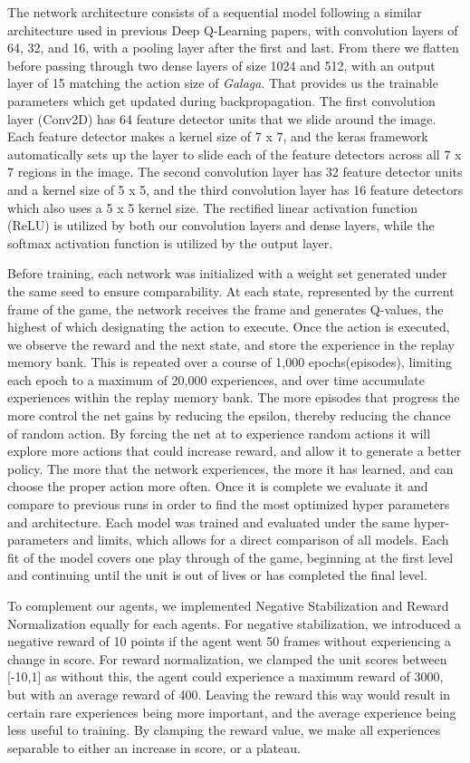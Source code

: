 \documentclass[conference]{IEEEtran}
\begin{document}
The network architecture consists of a sequential model following a similar architecture used in previous Deep Q-Learning papers, with convolution layers of 64, 32, and 16, with a pooling layer after the first and last. From there we flatten before passing through two dense layers of size 1024 and 512, with an output layer of 15 matching the action size of \textit{Galaga}. That provides us the trainable parameters which get updated during backpropagation. The first convolution layer (Conv2D) has 64 feature detector units that we slide around the image. Each feature detector makes a kernel size of 7 x 7, and the keras framework automatically sets up the layer to slide each of the feature detectors across all 7 x 7 regions in the image. The second convolution layer has 32 feature detector units and a kernel size of 5 x 5, and the third convolution layer has 16 feature detectors which also uses a 5 x 5 kernel size. The rectified linear activation function (ReLU) is utilized by both our convolution layers and dense layers, while the softmax activation function is utilized by the output layer.\par
Before training, each network was initialized with a weight set generated under the same seed to ensure comparability. At each state, represented by the current frame of the game, the network receives the frame and generates Q-values, the highest of which designating the action to execute. Once the action is executed, we observe the reward and the next state, and store the experience in the replay memory bank. This is repeated over a course of 1,000 epochs(episodes), limiting each epoch to a maximum of 20,000 experiences, and over time accumulate experiences within the replay memory bank. The more episodes that progress the more control the net gains by reducing the epsilon, thereby reducing the chance of random action. By forcing the net at to experience random actions it will explore more actions that could increase reward, and allow it to generate a better policy. The more that the network experiences, the more it has learned, and can choose the proper action more often. Once it is complete we evaluate it and compare to previous runs in order to find the most optimized hyper parameters and architecture. Each model was trained and evaluated under the same hyper-parameters and limits, which allows for a direct comparison of all models. Each fit of the model covers one play through of the game, beginning at the first level and continuing until the unit is out of lives or has completed the final level.\par
To complement our agents, we implemented Negative Stabilization and Reward Normalization equally for each agents. For negative stabilization, we introduced a negative reward of 10 points if the agent went 50 frames without experiencing a change in score. For reward normalization, we clamped the unit scores between [-10,1] as without this, the agent could experience a maximum reward of 3000, but with an average reward of 400. Leaving the reward this way would result in certain rare experiences being more important, and the average experience being less useful to training. By clamping the reward value, we make all experiences separable to either an increase in score, or a plateau.
\end{document}
